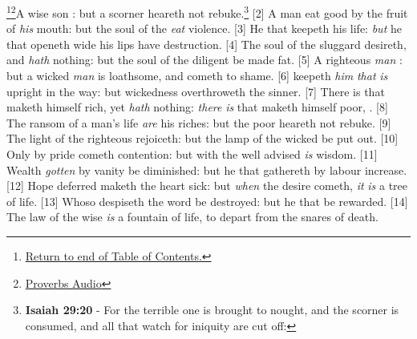 \footnote{\textcolor[cmyk]{0.99998,1,0,0}{\hyperlink{TOC}{Return to end of Table of Contents.}}}\footnote{\href{https://audiobible.com/bible/proverbs_13.html}{\textcolor[cmyk]{0.99998,1,0,0}{Proverbs Audio}}}\textcolor[cmyk]{0.99998,1,0,0}{A wise son : but a scorner heareth not rebuke.}\footnote{\textbf{Isaiah 29:20} - For the terrible one is brought to nought, and the scorner is consumed, and all that watch for iniquity are cut off:}
[2] \textcolor[cmyk]{0.99998,1,0,0}{A man  eat good by the fruit of \emph{his} mouth: but the soul of the  \emph{} \emph{eat} violence.}
[3] \textcolor[cmyk]{0.99998,1,0,0}{He that  keepeth his life: \emph{but} he that openeth wide his lips  have destruction.}
[4] \textcolor[cmyk]{0.99998,1,0,0}{The soul of the sluggard desireth, and \emph{hath} nothing: but the soul of the diligent  be made fat.}
[5] \textcolor[cmyk]{0.99998,1,0,0}{A righteous \emph{man} : but a wicked \emph{man} is loathsome, and cometh to shame.}
[6] \textcolor[cmyk]{0.99998,1,0,0}{ keepeth \emph{him} \emph{that} \emph{is} upright in the way: but wickedness overthroweth the sinner.}
[7] \textcolor[cmyk]{0.99998,1,0,0}{There is that maketh himself rich, yet \emph{hath} nothing: \emph{there} \emph{is} that maketh himself poor, .}
[8] \textcolor[cmyk]{0.99998,1,0,0}{The ransom of a man's life \emph{are} his riches: but the poor heareth not rebuke.}
[9] \textcolor[cmyk]{0.99998,1,0,0}{The light of the righteous rejoiceth: but the lamp of the wicked  be put out.}
[10] \textcolor[cmyk]{0.99998,1,0,0}{Only by pride cometh contention: but with the well advised \emph{is} wisdom.}
[11] \textcolor[cmyk]{0.99998,1,0,0}{Wealth \emph{gotten} by vanity  be diminished: but he that gathereth by labour  increase.}
[12] \textcolor[cmyk]{0.99998,1,0,0}{Hope deferred maketh the heart sick: but \emph{when} the desire cometh, \emph{it} \emph{is} a tree of life.}
[13] \textcolor[cmyk]{0.99998,1,0,0}{Whoso despiseth the word  be destroyed: but he that   be rewarded.}
[14] \textcolor[cmyk]{0.99998,1,0,0}{The law of the wise \emph{is} a fountain of life, to depart from the snares of death.}
